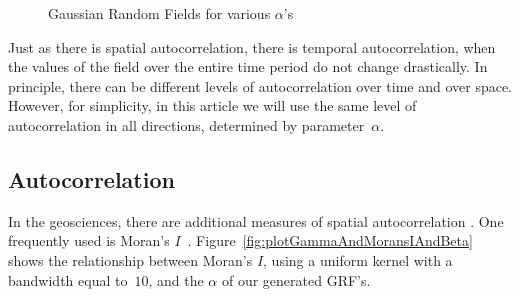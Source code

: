 \documentclass[ijgi,article,submit,moreauthors,pdftex,10pt,a4paper]{Definitions/mdpi}
\begin{document}
\begin{figure}[H]
\hspace{8mm}
\caption{Gaussian Random Fields for various $\alpha$'s}
\label{fig:GaussianRandomField}
\end{figure}

Just as there is spatial autocorrelation, there is temporal autocorrelation, when the values of the field over the entire time period do not change drastically. In principle, there can be different levels of autocorrelation over time and over space. However, for simplicity, in this article we will use the same level of autocorrelation in all directions, determined by parameter~$\alpha$.

\subsection{Autocorrelation}
\label{sec:Materials and Methods/Autocorrelation}

In the geosciences, there are additional measures of spatial autocorrelation \cite{Eshel2011, Storch1999}. One frequently used is Moran's $I$~\cite{Moran1950, Hubert1981, PySAL}. Figure~\ref{fig:plotGammaAndMoransIAndBeta} shows the relationship between Moran's $I$, using a uniform kernel with a bandwidth equal to~$10$, and the $\alpha$ of our generated GRF's.
\end{document}
